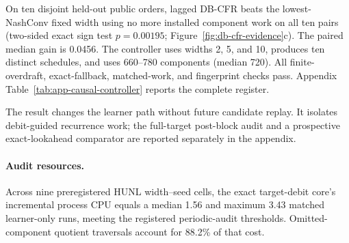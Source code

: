 On ten disjoint held-out public orders, lagged DB-CFR beats the lowest-NashConv
fixed width using no more installed component work on all ten pairs
(two-sided exact sign test $p=0.00195$; Figure~\ref{fig:db-cfr-evidence}c).
The paired median gain is 0.0456.  The
controller uses widths 2, 5, and 10, produces ten distinct schedules, and uses
660--780 components (median 720).  All finite-overdraft, exact-fallback,
matched-work, and fingerprint checks pass.  Appendix
Table~\ref{tab:app-causal-controller} reports the complete register.

The result changes the learner path without future candidate replay.  It
isolates debit-guided recurrence work; the full-target post-block audit and a
prospective exact-lookahead comparator are reported separately in the appendix.

\paragraph{Audit resources.}
Across nine preregistered HUNL width--seed cells, the exact target-debit core's
incremental process CPU equals a median 1.56 and maximum 3.43 matched
learner-only runs, meeting the registered periodic-audit thresholds.  Omitted-
component quotient traversals account for 88.2\% of that cost.
